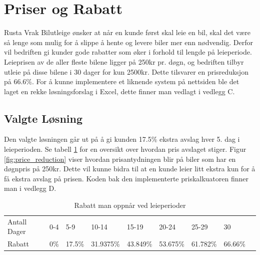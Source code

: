 \newpage
\section{Priser og Rabatt}
Rusta Vrak Bilutleige ønsker at når en kunde først skal leie en bil, skal det være så lenge som mulig for å slippe å hente og levere biler mer enn nødvendig. Derfor vil bedriften gi kunder gode rabatter som øker i forhold til lengde på leieperiode. Leieprisen av de aller fleste bilene ligger på 250kr pr. døgn, og bedriften tilbyr utleie på disse bilene i 30 dager for kun 2500kr. Dette tilsvarer en prisreduksjon på 66.6\%. For å kunne implementere et liknende system på nettsiden ble det laget en rekke løsningsforslag i Excel, dette finner man vedlagt i vedlegg C.

\subsection*{Valgte Løsning}
Den valgte løsningen går ut på å gi kunden 17.5\% ekstra avslag hver 5. dag i leieperioden. Se tabell \ref{table:percent} for en oversikt over hvordan pris avslaget stiger. Figur \ref{fig:price_reduction} viser hvordan prisantydningen blir på biler som har en døgnpris på 250kr. Dette vil kunne bidra til at en kunde leier litt ekstra kun for å få ekstra avslag på prisen. Koden bak den implementerte priskalkuatoren finner man i vedlegg D.

\begin{table}[htbp]
\centering
\caption{Rabatt man oppnår ved leieperioder}
\label{table:percent}
\begin{tabular}{|l|l|l|l|l|l|l|l|l}
\cline{1-8}
Antall Dager & 0-4   & 5-9    & 10-14     & 15-19    & 20-24    & 25-29    & 30      &  \\ \cline{1-8}
Rabatt       & 0\% & 17.5\% & 31.9375\% & 43.849\% & 53.675\% & 61.782\% & 66.66\% &  \\ \cline{1-8}
\end{tabular}
\end{table}



